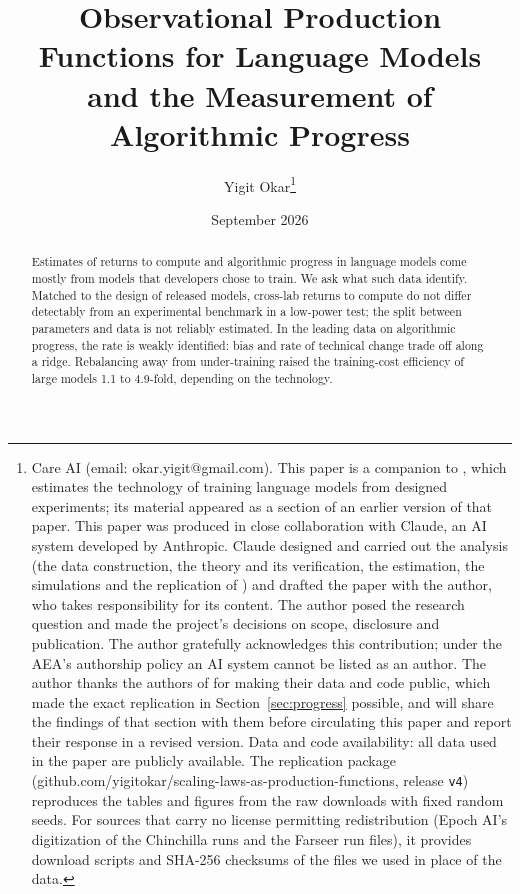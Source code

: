 \documentclass[AER,finalmode]{AEA}
\theoremstyle{definition}
\theoremstyle{remark}
\begin{document}
\title{Observational Production Functions for Language Models and the Measurement of Algorithmic Progress}
\author{Yigit Okar\thanks{Care AI (email: okar.yigit@gmail.com). This paper is a companion to \citet{okar2026what},
which estimates the technology of training language models from designed experiments; its material appeared as a
section of an earlier version of that paper. This paper was produced in close collaboration with Claude, an AI system
developed by Anthropic. Claude designed and carried out the analysis (the data construction, the theory and its
verification, the estimation, the simulations and the replication of \citet{ho2024algorithmic}) and drafted the paper
with the author, who takes responsibility for its content. The author posed the research question and made the
project's decisions on scope, disclosure and publication. The author gratefully acknowledges this contribution; under
the AEA's authorship policy an AI system cannot be listed as an author. The author thanks the authors of
\citet{ho2024algorithmic} for making their data and code public, which made the exact replication in
Section~\ref{sec:progress} possible, and will share the findings of that section with them before circulating this
paper and report their response in a revised version. Data and code availability: all data used in the paper are
publicly available. The replication package (github.com/yigitokar/scaling-laws-as-production-functions, release
\texttt{v4}) reproduces the tables and figures from the raw downloads with fixed random seeds. For sources that carry
no license permitting redistribution (Epoch AI's digitization of the Chinchilla runs and the Farseer run files), it
provides download scripts and SHA-256 checksums of the files we used in place of
the data.}}
\date{September 2026}

\begin{abstract}
Estimates of returns to compute and algorithmic progress in language models come mostly from models that developers
chose to train. We ask what such data identify. Matched to the design of released models, cross-lab returns to compute
do not differ detectably from an experimental benchmark in a low-power test; the split between parameters and data is
not reliably estimated. In the leading data on algorithmic progress, the rate is weakly identified: bias and rate of
technical change trade off along a ridge. Rebalancing away from under-training raised the training-cost efficiency of
large models 1.1 to 4.9-fold, depending on the technology.
\end{abstract}
\end{document}
